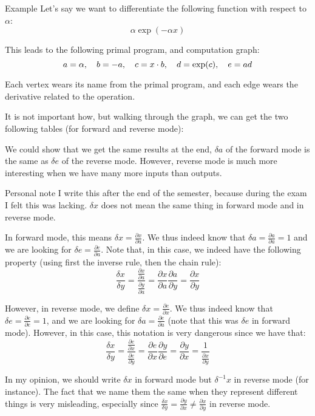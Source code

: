 \documentclass[a4paper]{article}
\begin{document}
\begin{parag}{Example}
    Let's say we want to differentiate the following function with respect to $\alpha$: 
    \[\alpha \exp\left(-\alpha x\right)\]
    
    This leads to the following primal program, and computation graph:
    \[a = \alpha, \mathspace b = -a, \mathspace c = x\cdot b, \mathspace d = \exp\left(c\right), \mathspace e = ad\]

    Each vertex wears its name from the primal program, and each edge wears the derivative related to the operation.

    It is not important how, but walking through the graph, we can get the two following tables (for forward and reverse mode):

    We could show that we get the same results at the end, $\delta a$ of the forward mode is the same as $\delta e$ of the reverse mode. However, reverse mode is much more interesting when we have many more inputs than outputs.
    
    \begin{subparag}{Personal note}
        I write this after the end of the semester, because during the exam I felt this was lacking. $\delta x$ does not mean the same thing in forward mode and in reverse mode.

        In forward mode, this means $\delta x = \frac{\partial x}{\partial a}$. We thus indeed know that $\delta a = \frac{\partial a}{\partial a} = 1$ and we are looking for $\delta e = \frac{\partial e}{\partial a}$. Note that, in this case, we indeed have the following property (using first the inverse rule, then the chain rule): 
        \[\frac{\delta x}{\delta y} = \frac{\frac{\partial x}{\partial a}}{\frac{\partial y}{\partial a} } = \frac{\partial x}{\partial a} \frac{\partial a}{\partial y}  = \frac{\partial x}{\partial y} \]

        However, in reverse mode, we define $\delta x = \frac{\partial e}{\partial x}$. We thus indeed know that $\delta e = \frac{\partial e}{\partial e} = 1$, and we are looking for $\delta a = \frac{\partial e}{\partial a}$ (note that this was $\delta e$ in forward mode). However, in this case, this notation is very dangerous since we have that: 
        \[\frac{\delta x}{\delta y} = \frac{\frac{\partial e}{\partial x} }{\frac{\partial e}{\partial y} } = \frac{\partial e}{\partial x} \frac{\partial y}{\partial e} = \frac{\partial y}{\partial x} = \frac{1}{\frac{\partial x}{\partial y} }\]
        
        In my opinion, we should write $\delta x$ in forward mode but $\delta^{-1} x$ in reverse mode (for instance). The fact that we name them the same when they represent different things is very misleading, especially since $\frac{\delta x}{\delta y} = \frac{\partial y}{\partial x} \neq \frac{\partial x}{\partial y} $ in reverse mode.
    \end{subparag}
\end{parag}
\end{document}
